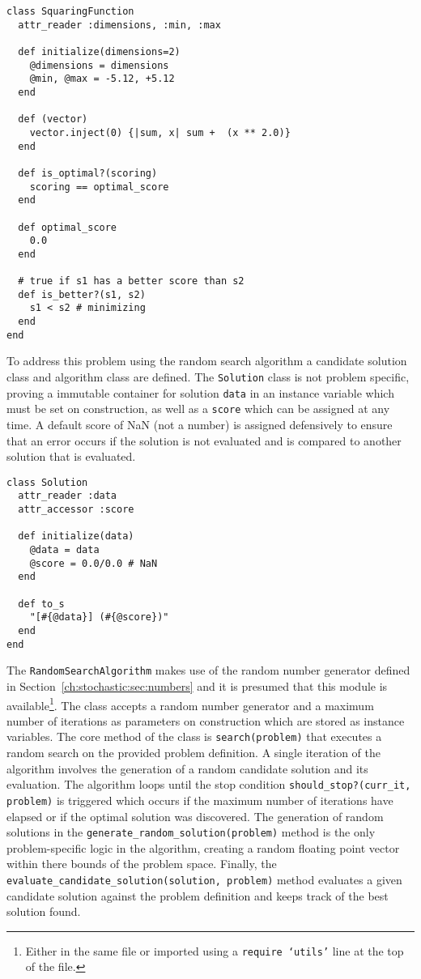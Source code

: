 \begin{lstlisting}
class SquaringFunction
  attr_reader :dimensions, :min, :max

  def initialize(dimensions=2)
    @dimensions = dimensions
    @min, @max = -5.12, +5.12
  end

  def (vector)
    vector.inject(0) {|sum, x| sum +  (x ** 2.0)}
  end  

  def is_optimal?(scoring)
    scoring == optimal_score
  end

  def optimal_score
    0.0
  end
  
  # true if s1 has a better score than s2
  def is_better?(s1, s2)
    s1 < s2 # minimizing
  end
end
\end{lstlisting}

To address this problem using the random search algorithm a candidate solution class and algorithm class are defined. The \texttt{Solution} class is not problem specific, proving a immutable container for solution \texttt{data} in an instance variable which must be set on construction, as well as a \texttt{score} which can be assigned at any time. A default score of NaN (not a number) is assigned defensively to ensure that an error occurs if the solution is not evaluated and is compared to another solution that is evaluated.

\begin{lstlisting}
class Solution
  attr_reader :data
  attr_accessor :score
  
  def initialize(data)
    @data = data
    @score = 0.0/0.0 # NaN
  end
  
  def to_s
    "[#{@data}] (#{@score})"
  end    
end
\end{lstlisting}

The \texttt{RandomSearchAlgorithm} makes use of the random number generator defined in Section~\ref{ch:stochastic:sec:numbers} and it is presumed that this module is available\footnote{Either in the same file or imported using a \texttt{require `utils'} line at the top of the file.}. The class accepts a random number generator and a maximum number of iterations as parameters on construction which are stored as instance variables. The core method of the class is \texttt{search(problem)} that executes a random search on the provided problem definition. A single iteration of the algorithm involves the generation of a random candidate solution and its evaluation. The algorithm loops until the stop condition \texttt{should\_stop?(curr\_it, problem)} is triggered which occurs if the maximum number of iterations have elapsed or if the optimal solution was discovered. The generation of random solutions in the \texttt{generate\_random\_solution(problem)} method is the only problem-specific logic in the algorithm, creating a random floating point vector within there bounds of the problem space. Finally, the \texttt{evaluate\_candidate\_solution(solution, problem)} method evaluates a given candidate solution against the problem definition and keeps track of the best solution found.

